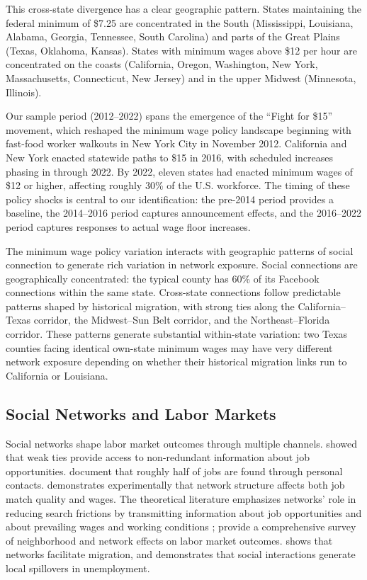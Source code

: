 \documentclass[12pt]{article}
\begin{document}
This cross-state divergence has a clear geographic pattern. States maintaining the federal minimum of \$7.25 are concentrated in the South (Mississippi, Louisiana, Alabama, Georgia, Tennessee, South Carolina) and parts of the Great Plains (Texas, Oklahoma, Kansas). States with minimum wages above \$12 per hour are concentrated on the coasts (California, Oregon, Washington, New York, Massachusetts, Connecticut, New Jersey) and in the upper Midwest (Minnesota, Illinois).

Our sample period (2012--2022) spans the emergence of the ``Fight for \$15'' movement, which reshaped the minimum wage policy landscape beginning with fast-food worker walkouts in New York City in November 2012. California and New York enacted statewide paths to \$15 in 2016, with scheduled increases phasing in through 2022. By 2022, eleven states had enacted minimum wages of \$12 or higher, affecting roughly 30\% of the U.S. workforce. The timing of these policy shocks is central to our identification: the pre-2014 period provides a baseline, the 2014--2016 period captures announcement effects, and the 2016--2022 period captures responses to actual wage floor increases.

The minimum wage policy variation interacts with geographic patterns of social connection to generate rich variation in network exposure. Social connections are geographically concentrated: the typical county has 60\% of its Facebook connections within the same state. Cross-state connections follow predictable patterns shaped by historical migration, with strong ties along the California--Texas corridor, the Midwest--Sun Belt corridor, and the Northeast--Florida corridor. These patterns generate substantial within-state variation: two Texas counties facing identical own-state minimum wages may have very different network exposure depending on whether their historical migration links run to California or Louisiana.

\subsection{Social Networks and Labor Markets}

Social networks shape labor market outcomes through multiple channels. \citet{granovetter1973strength} showed that weak ties provide access to non-redundant information about job opportunities. \citet{ioannides2004job} document that roughly half of jobs are found through personal contacts. \citet{beaman2012networks} demonstrates experimentally that network structure affects both job match quality and wages. The theoretical literature emphasizes networks' role in reducing search frictions by transmitting information about job opportunities \citep{calvo2004effects} and about prevailing wages and working conditions \citep{brown2016firms}; \citet{topa2017networks} provide a comprehensive survey of neighborhood and network effects on labor market outcomes. \citet{munshi2003networks} shows that networks facilitate migration, and \citet{topa2001social} demonstrates that social interactions generate local spillovers in unemployment.
\end{document}
